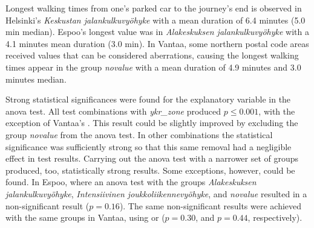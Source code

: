 Longest walking times from one's parked car to the journey's end is observed in Helsinki's \textit{Keskustan jalankulkuvyöhyke} with a mean duration of 6.4 minutes (5.0 min median). Espoo's longest  value was in \textit{Alakeskuksen jalankulkuvyöhyke} with a 4.1 minutes mean duration (3.0 min). In Vantaa, some northern postal code areas received  values that can be considered aberrations, causing the longest walking times appear in the group \textit{novalue} with a mean duration of 4.9 minutes and 3.0 minutes median.

Strong statistical significances were found for the explanatory variable  in the \acrshort{anova} test. All test combinations with \textit{ykr\_zone} produced $p \leq 0.001$, with the exception of Vantaa's . This result could be slightly improved by excluding the group \textit{novalue} from the \acrshort{anova} test. In other combinations the statistical significance was sufficiently strong so that this same removal had a negligible effect in test results. Carrying out the \acrshort{anova} test with a narrower set of groups produced, too, statistically strong results. Some exceptions, however, could be found. In Espoo, where an \acrshort{anova} test with the groups \textit{Alakeskuksen jalankulkuvyöhyke}, \textit{Intensiivinen joukkoliikennevyöhyke}, and \textit{novalue} resulted in a non-significant result ($p = 0.16$). The same non-significant results were achieved with the same groups in Vantaa, using  or  ($p = 0.30$, and $p = 0.44$, respectively).

